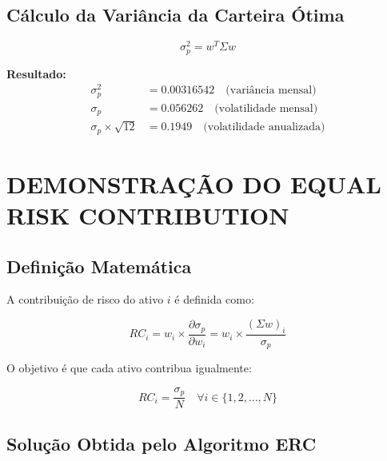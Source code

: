 \subsection{Cálculo da Variância da Carteira Ótima}

\begin{equation}
\sigma_p^2 = w^T \Sigma w
\end{equation}

\textbf{Resultado:}
\begin{align}
\sigma_p^2 &= 0.00316542 \quad \text{(variância mensal)} \\
\sigma_p &= 0.056262 \quad \text{(volatilidade mensal)} \\
\sigma_p \times \sqrt{12} &= 0.1949 \quad \text{(volatilidade anualizada)}
\end{align}

\section{DEMONSTRAÇÃO DO EQUAL RISK CONTRIBUTION}

\subsection{Definição Matemática}

A contribuição de risco do ativo $i$ é definida como:

\begin{equation}
RC_i = w_i \times \frac{\partial \sigma_p}{\partial w_i} = w_i \times \frac{(\Sigma w)_i}{\sigma_p}
\end{equation}

O objetivo é que cada ativo contribua igualmente:

\begin{equation}
RC_i = \frac{\sigma_p}{N} \quad \forall i \in \{1, 2, ..., N\}
\end{equation}

\subsection{Solução Obtida pelo Algoritmo ERC}

